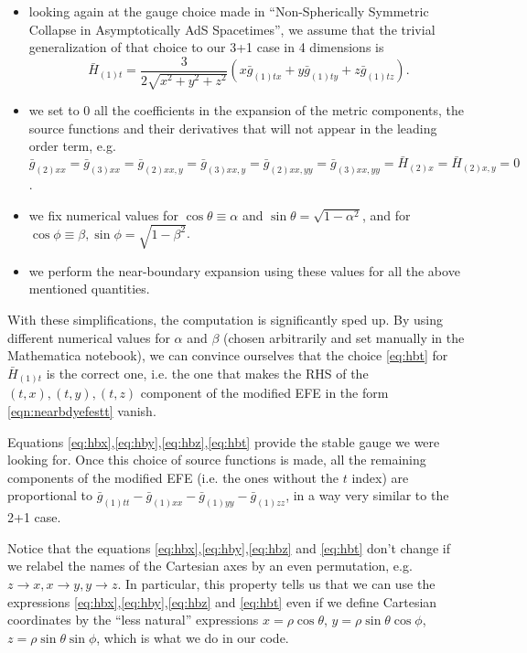 \documentclass[12pt]{article}
\begin{document}
\begin{itemize}
\item looking again at the gauge choice made in ``Non-Spherically Symmetric Collapse in Asymptotically AdS Spacetimes'', we assume that the trivial generalization of that choice to our 3+1 case in 4 dimensions is
\begin{equation}
\label{eq:hbt}
\bar{H}_{(1)t}=\frac{3}{2\sqrt{x^2+y^2+z^2}}(x \bar{g}_{(1)tx}+y\bar{g}_{(1)ty}+z\bar{g}_{(1)tz}).
\end{equation}
\item we set to 0 all the coefficients in the expansion of the metric components, the source functions and their derivatives that will not appear in the leading order term, e.g. $\bar{g}_{(2)xx}=\bar{g}_{(3)xx}=\bar{g}_{(2)xx,y}=\bar{g}_{(3)xx,y}=\bar{g}_{(2)xx,yy}=\bar{g}_{(3)xx,yy}=\bar{H}_{(2)x}=\bar{H}_{(2)x,y}=0$.
\item we fix numerical values for $\cos\theta\equiv\alpha$ and $\sin\theta=\sqrt{1-\alpha^2}$, and for $\cos\phi\equiv\beta,\sin\phi=\sqrt{1-\beta^2}$.
\item we perform the near-boundary expansion using these values for all the above mentioned quantities.
\end{itemize}
With these simplifications, the computation is significantly sped up. By using different numerical values for $\alpha$ and $\beta$ (chosen arbitrarily and set manually in the Mathematica notebook), we can convince ourselves that the choice \eqref{eq:hbt} for $\bar{H}_{(1)t}$ is the correct one, i.e. the one that makes the RHS of the $(t,x),(t,y),(t,z)$ component of the modified EFE in the form \eqref{eqn:nearbdyefestt} vanish.

Equations \eqref{eq:hbx},\eqref{eq:hby},\eqref{eq:hbz},\eqref{eq:hbt} provide the stable gauge we were looking for.
Once this choice of source functions is made, all the remaining components of the modified EFE (i.e. the ones without the $t$ index) are proportional to $\bar{g}_{(1) tt}-\bar{g}_{(1) xx}-\bar{g}_{(1) yy}-\bar{g}_{(1)zz}$, in a way very similar to the 2+1 case.

Notice that the equations \eqref{eq:hbx},\eqref{eq:hby},\eqref{eq:hbz} and \eqref{eq:hbt} don't change if we relabel the names of the Cartesian axes by an even permutation, e.g. $z\to x, x\to y,y\to z$. In particular, this property tells us that we can use the expressions \eqref{eq:hbx},\eqref{eq:hby},\eqref{eq:hbz} and \eqref{eq:hbt} even if we define Cartesian coordinates by the ``less natural'' expressions $x=\rho\cos\theta$, $y=\rho\sin\theta\cos\phi$, $z=\rho\sin\theta\sin\phi$, which is what we do in our code.
\end{document}

